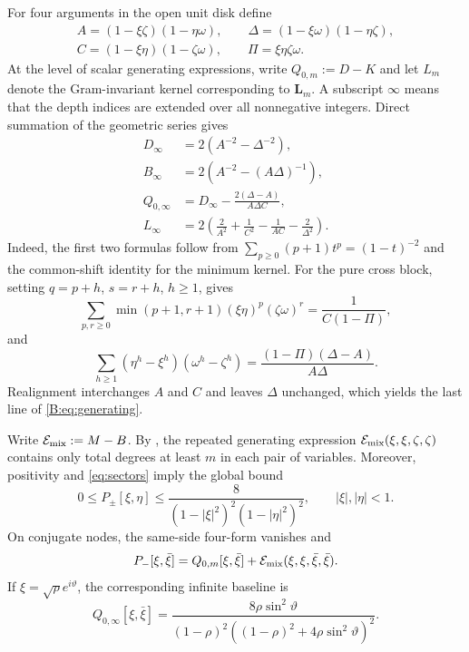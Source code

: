 For four arguments in the open unit disk define
\begin{equation}\label{B:eq:denominators}
\begin{gathered}
 A=(1-\xi\zeta)(1-\eta\omega),\qquad
 \Delta=(1-\xi\omega)(1-\eta\zeta),\\
 C=(1-\xi\eta)(1-\zeta\omega),\qquad
 \Pi=\xi\eta\zeta\omega.
\end{gathered}
\end{equation}
At the level of scalar generating expressions, write
$Q_{0,m}:=D-K$ and let $L_m$ denote the Gram-invariant kernel
corresponding to \(\mathbf L_m\).  A subscript \(\infty\) means that the
depth indices are extended over all nonnegative integers.  Direct summation
of the geometric series gives
\begin{equation}\label{B:eq:generating}
\begin{aligned}
 D_\infty&=2(A^{-2}-\Delta^{-2}),\\
 B_\infty&=2(A^{-2}-(A\Delta)^{-1}),\\
 Q_{0,\infty}&=D_\infty-\frac{2(\Delta-A)}{A\Delta C},\\
 L_\infty&=2\left(\frac2{A^2}+\frac1{C^2}
                       -\frac1{AC}-\frac2{\Delta^2}\right).
\end{aligned}
\end{equation}
Indeed, the first two formulas follow from
$\sum_{p\ge0}(p+1)t^p=(1-t)^{-2}$ and the common-shift identity for the
minimum kernel.  For the pure cross block, setting $q=p+h$, $s=r+h$,
$h\ge1$, gives
\[
 \sum_{p,r\ge0}\min(p+1,r+1)(\xi\eta)^p(\zeta\omega)^r
     =\frac1{C(1-\Pi)},
\]
and
\[
 \sum_{h\ge1}(\eta^h-\xi^h)(\omega^h-\zeta^h)
     =\frac{(1-\Pi)(\Delta-A)}{A\Delta}.
\]
Realignment interchanges $A$ and $C$ and leaves $\Delta$ unchanged,
which yields the last line of \eqref{B:eq:generating}.

Write $\mathcal E_{\rm mix}:=M-B$.  By , the repeated
generating expression $\mathcal E_{\rm mix}(\xi,\xi,\zeta,\zeta)$
contains only total degrees at least $m$ in each pair of variables.
Moreover, positivity and \eqref{eq:sectors} imply the global bound
\begin{equation}\label{B:eq:global}
 0\le P_\pm[\xi,\eta]
 \le\frac8{(1-|\xi|^2)^2(1-|\eta|^2)^2},
 \qquad |\xi|,|\eta|<1.
\end{equation}
On conjugate nodes, the same-side four-form vanishes and
\begin{equation}\label{B:eq:repeated}
 P_-[\xi,\bar\xi]
 =Q_{0,m}[\xi,\bar\xi]
  +\mathcal E_{\rm mix}(\xi,\xi,\bar\xi,\bar\xi).
\end{equation}
If $\xi=\sqrt\rho e^{i\vartheta}$, the corresponding infinite baseline is
\begin{equation}\label{B:eq:repeated-baseline}
 Q_{0,\infty}[\xi,\bar\xi]
 =\frac{8\rho\sin^2\vartheta}
 {(1-\rho)^2((1-\rho)^2+4\rho\sin^2\vartheta)^2}.
\end{equation}

